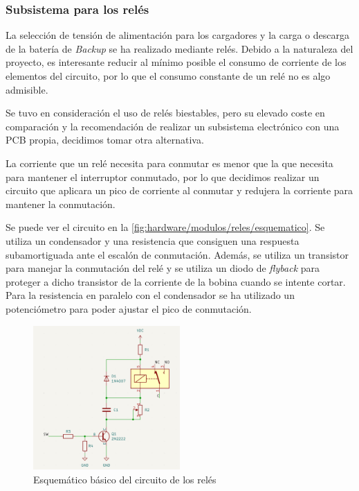 \subsubsection{Subsistema para los relés}\label{subsubsec:hardware/circuito-reles}

La selección de tensión de alimentación para los cargadores y la carga o descarga de la batería de \textit{Backup} se ha realizado mediante relés. Debido a la naturaleza del proyecto, es interesante reducir al mínimo posible el consumo de corriente de los elementos del circuito, por lo que el consumo constante de un relé no es algo admisible.

Se tuvo en consideración el uso de relés biestables, pero su elevado coste en comparación y la recomendación de realizar un subsistema electrónico con una PCB propia, decidimos tomar otra alternativa. 

La corriente que un relé necesita para conmutar es menor que la que necesita para mantener el interruptor conmutado, por lo que decidimos realizar un circuito que aplicara un pico de corriente al conmutar y redujera la corriente para mantener la conmutación. 

Se puede ver el circuito en la \autoref{fig:hardware/modulos/reles/esquematico}. Se utiliza un condensador y una resistencia que consiguen una respuesta subamortiguada ante el escalón de conmutación. Además, se utiliza un transistor para manejar la conmutación del relé y se utiliza un diodo de \textit{flyback} para proteger a dicho transistor de la corriente de la bobina cuando se intente cortar. Para la resistencia en paralelo con el condensador se ha utilizado un potenciómetro para poder ajustar el pico de conmutación. 

\begin{figure}[H]
    \centering
    \includegraphics[width=0.5\textwidth]{images/2-hardware/componentes/rele/circuitoRele.png}
    \caption{Esquemático básico del circuito de los relés}
    \label{fig:hardware/modulos/reles/esquematico}
\end{figure}

